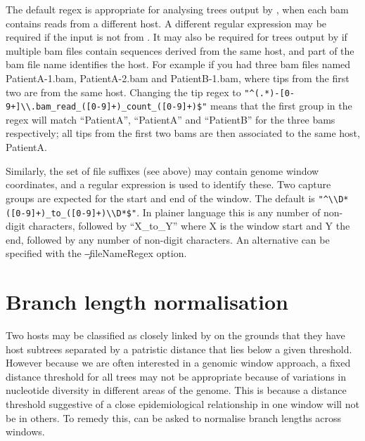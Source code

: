 The default regex is appropriate for analysing trees output by \pmt, when each bam contains reads from a different host.
A different regular expression may be required if the input is not from \pmt.
It may also be required for trees output by \pmt if multiple bam files contain sequences derived from the same host, and part of the bam file name identifies the host.
For example if you had three bam files named \mbox{PatientA-1.bam}, PatientA-2.bam and PatientB-1.bam, where tips from the first two are from the same host.
Changing the tip regex to \verb|"^(.*)-[0-9+]\\.bam_read_([0-9]+)_count_([0-9]+)$"| means that the first group in the regex will match ``PatientA'', ``PatientA'' and ``PatientB'' for the three bams respectively; all tips from the first two bams are then associated to the same host, PatientA.

Similarly, the set of file suffixes (see above) may contain genome window coordinates, and a regular expression is used to identify these.
Two capture groups are expected for the start and end of the window.
The default is \verb|"^\\D*([0-9]+)_to_([0-9]+)\\D*$"|.
In plainer language this is any number of non-digit characters, followed by ``X\_to\_Y'' where X is the window start and Y the end, followed by any number of non-digit characters.
An alternative can be specified with the \c{--fileNameRegex} option.

\section{Branch length normalisation} \label{sec:normalisation}

Two hosts may be classified as closely linked by \pat on the grounds that they have host subtrees separated by a patristic distance that lies below a given threshold.
However because we are often interested in a genomic window approach, a fixed distance threshold for all trees may not be appropriate because of variations in nucleotide diversity in different areas of the genome.
This is because a distance threshold suggestive of a close epidemiological relationship in one window will not be in others.
To remedy this, \pat can be asked to normalise branch lengths across windows.

